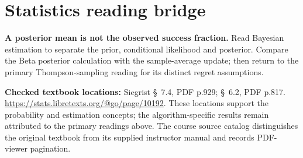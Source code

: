 \documentclass[11pt]{scrartcl}
\begin{document}
\section*{Statistics reading bridge}
\textbf{A posterior mean is not the observed success fraction.} Read Bayesian estimation to separate the prior, conditional likelihood and posterior. Compare the Beta posterior calculation with the sample-average update; then return to the primary Thompson-sampling reading for its distinct regret assumptions.

\textbf{Checked textbook locations:} Siegrist \S~7.4, PDF p.929; \S~6.2, PDF p.817. \url{https://stats.libretexts.org/@go/page/10192}. These locations support the probability and estimation concepts; the algorithm-specific results remain attributed to the primary readings above. The course source catalog distinguishes the original textbook from its supplied instructor manual and records PDF-viewer pagination.
\end{document}
